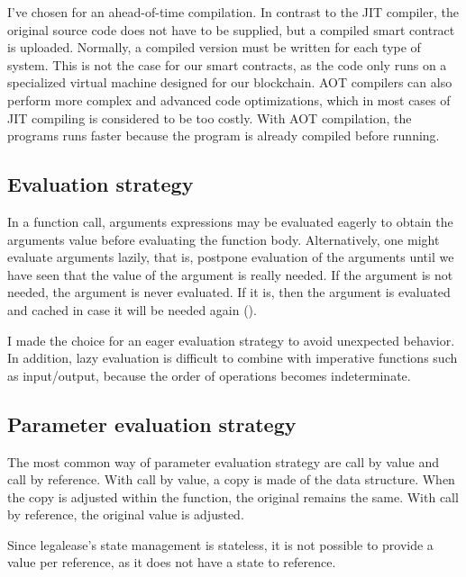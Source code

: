 \documentclass{uva-inf-article}
\begin{document}
\par I've chosen for an ahead-of-time compilation. In contrast to the JIT compiler, 
the original source code does not have to be supplied, but a compiled smart contract is uploaded.
Normally, a compiled version must be written for each type of system. 
This is not the case for our smart contracts, as the code only runs on a specialized virtual machine 
designed for our blockchain. AOT compilers can also perform more complex and advanced code optimizations,
which in most cases of JIT compiling is considered to be too costly.
With AOT compilation, the programs runs faster because the program is already compiled before running.

\subsection{Evaluation strategy}
\par In a function call, arguments expressions may be evaluated eagerly 
to obtain the arguments value before evaluating the function body.
Alternatively, one might evaluate arguments lazily, that is, postpone evaluation 
of the arguments until we have seen that the value of the argument is really needed.
If the argument is not needed, the argument is never evaluated. If it is, 
then the argument is evaluated and cached in case it will be needed again
(\cite{Sestoft2012-2}).
\vspace{5mm}

\par I made the choice for an eager evaluation strategy to avoid unexpected behavior.
In addition, lazy evaluation is difficult to combine with imperative functions such as 
input/output, because the order of operations becomes indeterminate.

\subsection{Parameter evaluation strategy}
\par The most common way of parameter evaluation strategy are call by value and call by reference. 
With call by value, a copy is made of the data structure. When the copy is adjusted within the function, 
the original remains the same. With call by reference, the original value is adjusted.
\vspace{5mm}

\par Since legalease's state management is stateless, it is not possible to provide a value 
per reference, as it does not have a state to reference.
\end{document}
